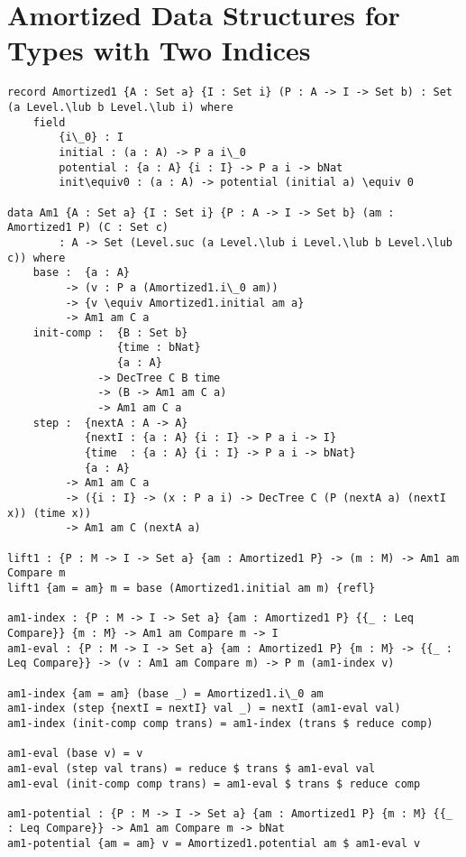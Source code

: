 \section{Amortized Data Structures for Types with Two Indices}
\label{sec:atime1}
\begin{lstlisting}[caption={Amortized data structures and functions for data types with two indices},label={lst:appendix:atime1}]
record Amortized1 {A : Set a} {I : Set i} (P : A -> I -> Set b) : Set (a Level.\lub b Level.\lub i) where
    field
        {i\_0} : I
        initial : (a : A) -> P a i\_0
        potential : {a : A} {i : I} -> P a i -> bNat
        init\equiv0 : (a : A) -> potential (initial a) \equiv 0

data Am1 {A : Set a} {I : Set i} {P : A -> I -> Set b} (am : Amortized1 P) (C : Set c)
        : A -> Set (Level.suc (a Level.\lub i Level.\lub b Level.\lub c)) where
    base :  {a : A}
         -> (v : P a (Amortized1.i\_0 am))
         -> {v \equiv Amortized1.initial am a}
         -> Am1 am C a
    init-comp :  {B : Set b}
                 {time : bNat}
                 {a : A}
              -> DecTree C B time
              -> (B -> Am1 am C a)
              -> Am1 am C a
    step :  {nextA : A -> A}
            {nextI : {a : A} {i : I} -> P a i -> I}
            {time  : {a : A} {i : I} -> P a i -> bNat}
            {a : A}
         -> Am1 am C a
         -> ({i : I} -> (x : P a i) -> DecTree C (P (nextA a) (nextI x)) (time x))
         -> Am1 am C (nextA a)

lift1 : {P : M -> I -> Set a} {am : Amortized1 P} -> (m : M) -> Am1 am Compare m
lift1 {am = am} m = base (Amortized1.initial am m) {refl}

am1-index : {P : M -> I -> Set a} {am : Amortized1 P} {{_ : Leq Compare}} {m : M} -> Am1 am Compare m -> I
am1-eval : {P : M -> I -> Set a} {am : Amortized1 P} {m : M} -> {{_ : Leq Compare}} -> (v : Am1 am Compare m) -> P m (am1-index v)

am1-index {am = am} (base _) = Amortized1.i\_0 am
am1-index (step {nextI = nextI} val _) = nextI (am1-eval val)
am1-index (init-comp comp trans) = am1-index (trans $ reduce comp)

am1-eval (base v) = v
am1-eval (step val trans) = reduce $ trans $ am1-eval val
am1-eval (init-comp comp trans) = am1-eval $ trans $ reduce comp

am1-potential : {P : M -> I -> Set a} {am : Amortized1 P} {m : M} {{_ : Leq Compare}} -> Am1 am Compare m -> bNat
am1-potential {am = am} v = Amortized1.potential am $ am1-eval v


\end{lstlisting}
